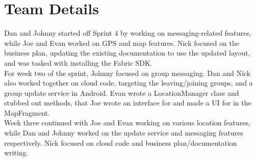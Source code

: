 \documentclass[11pt]{article}
\begin{document}
	
\section*{Team Details}
Dan and Johnny started off Sprint 4 by working on messaging-related features, while Joe and Evan worked on GPS and map features. Nick focused on the business plan, updating the existing documentation to use the updated layout, and was tasked with installing the Fabric SDK.\\

For week two of the sprint, Johnny focused on group messaging. Dan and Nick also worked together on cloud code, targeting the leaving/joining groups, and a group update service in Android. Evan wrote a LocationManager class and stubbed out methods, that Joe wrote an interface for and made a UI for in the MapFragment.\\

Week three continued with Joe and Evan working on various location features, while Dan and Johnny worked on the update service and messaging features respectively. Nick focused on cloud code and business plan/documentation writing.
\end{document}
